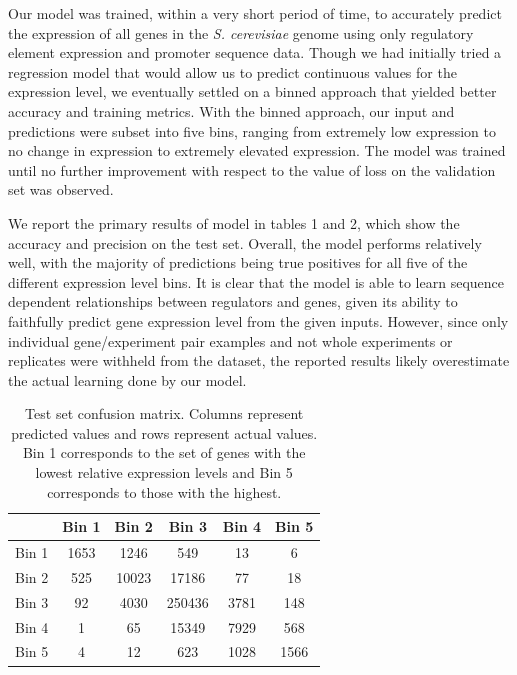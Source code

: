 \documentclass{article}
\begin{document}
Our model was trained, within a very short period of time, to accurately predict the expression of all genes in the \textit{S. cerevisiae} genome using only regulatory element expression and promoter sequence data. Though we had initially tried a regression model that would allow us to predict continuous values for the expression level, we eventually settled on a binned approach that yielded better accuracy and training metrics. With the binned approach, our input and predictions were subset into five bins, ranging from extremely low expression to no change in expression to extremely elevated expression. The model was trained until no further improvement with respect to the value of loss on the validation set was observed.

We report the primary results of model in tables 1 and 2, which show the accuracy and precision on the test set. Overall, the model performs relatively well, with the majority of predictions being true positives for all five of the different expression level bins. It is clear that the model is able to learn sequence dependent relationships between regulators and genes, given its ability to faithfully predict gene expression level from the given inputs. However, since only individual gene/experiment pair examples and not whole experiments or replicates were withheld from the dataset, the reported results likely overestimate the actual learning done by our model.

	\begin{table}[H]
	\begin{center}
	\begin{tabular}{l|c|c|c|c|c}
	\hline
	  & Bin 1 & Bin 2 & Bin 3 & Bin 4 & Bin 5\\
	\hline
	Bin 1 & 1653 & 1246 & 549 & 13 & 6\\
	\hline
	Bin 2 & 525 & 10023 & 17186 & 77 & 18\\
	\hline
	Bin 3 & 92 & 4030 & 250436 & 3781 & 148\\
	\hline
	Bin 4 & 1 & 65 & 15349 & 7929 & 568\\
	\hline
	Bin 5 & 4 & 12 & 623 & 1028 & 1566\\
	\hline
	\end{tabular}
	\end{center}
	\caption{Test set confusion matrix. Columns represent predicted values and rows represent actual values. Bin 1 corresponds to the set of genes with the lowest relative expression levels and Bin 5 corresponds to those with the highest.}
	\end{table}
\end{document}
